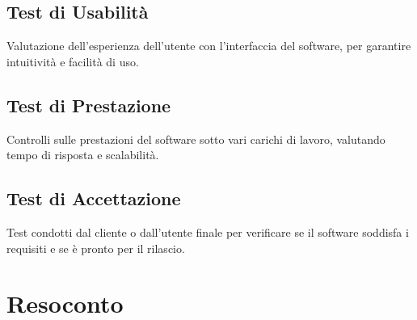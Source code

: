 \subsection{Test di Usabilità}
\par Valutazione dell'esperienza dell'utente con l'interfaccia del software, per garantire intuitività e facilità di uso.

\subsection{Test di Prestazione}
\par Controlli sulle prestazioni del software sotto vari carichi di lavoro, valutando tempo di risposta e scalabilità.


\subsection{Test di Accettazione}
\par Test condotti dal cliente o dall'utente finale per verificare se il software soddisfa i requisiti e se è pronto per il rilascio.

\newpage
\section{Resoconto}

   

